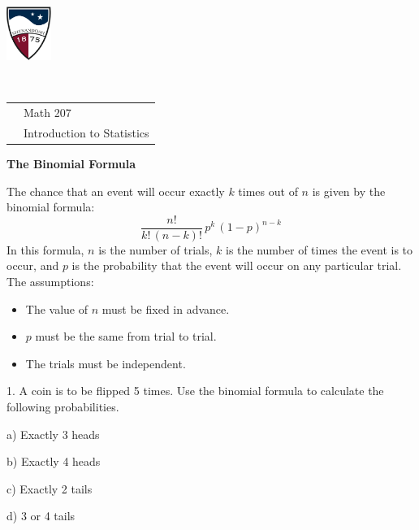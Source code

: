 \documentclass[10pt]{article}
\begin{document}
\pagestyle{empty}
\lstset{language=R, showspaces=false, showstringspaces=false}

\href{http://www.su.edu}{\includegraphics[height=1.75cm]{sulogo.eps}}
\vspace{-1.69cm}

{\small{\ }\hfill
\begin{tabular}{cl}
& Math 207\\
& Introduction to Statistics\\
\end{tabular}
}
\setlength{\baselineskip}{1.05\baselineskip}
\bigskip

\begin{center}
\textbf{\large  The Binomial Formula}
\end{center}
\newcommand{\Z}{\hphantom{0}}

The chance that an event will occur exactly $k$ times out of $n$ is given by 
the binomial formula:
\[\frac{n!}{k!\,(n-k)!}\,p^k\,(1-p)^{n-k}\]
In this formula, $n$ is the number of trials, $k$ is the number of times
the event is to occur, and $p$ is the probability that the event will occur
on any particular trial.    The assumptions:
\begin{itemize}
\item The value of $n$ must be fixed in advance.
\item $p$ must be the same from trial to trial.
\item The trials must be independent.
\end{itemize}
\medskip

1. A coin is to be flipped 5 times. 
Use the binomial formula to calculate the following probabilities.

\hspace{20pt} a)   Exactly 3 heads
\vspace{.4in}

\hspace{20pt} b)   Exactly 4 heads
\vspace{.4in}

\hspace{20pt} c) Exactly 2 tails
\vspace{.4in}

\hspace{20pt} d) 3 or 4 tails
\vspace{.4in}
\end{document}
